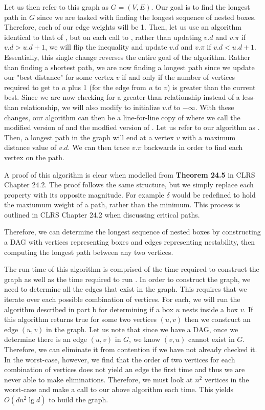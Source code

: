 \documentclass[11pt]{article}
\begin{document}
Let us then refer to this graph as $G = (V,E)$. Our goal is to find the longest path in $G$ since we are tasked with finding the longest sequence of nested boxes. Therefore, each of our edge weights will be 1. Then, let us use an algorithm identical to that of , but on each call to , rather than updating $v.d$ and $v.\pi$ if $v.d > u.d + 1$, we will flip the inequality and update $v.d$ and $v.\pi$ if $v.d < u.d + 1$. Essentially, this single change reverses the entire goal of the algorithm. Rather than finding a shortest path, we are now finding a longest path since we update our "best distance" for some vertex $v$ if and only if the number of vertices required to get to $u$ plus 1 (for the edge from $u$ to $v$) is greater than the current best. Since we are now checking for a greater-than relationship instead of a less-than relationship, we will also modify  to initialize $v.d$ to $-\infty$. With these changes, our algorithm can then be a line-for-line copy of  where we call the modified version of  and the modfied version of . Let us refer to our algorithm as . Then, a longest path in the graph will end at a vertex $v$ with a maximum distance value of $v.d$. We can then trace $v.\pi$ backwards in order to find each vertex on the path.

A proof of this algorithm is clear when modelled from \textbf{Theorem 24.5} in CLRS Chapter 24.2. The proof follows the same structure, but we simply replace each property with its opposite magnitude. For example $\delta$ would be redefined to hold the maxiumum weight of a path, rather than the minimum. This process is outlined in CLRS Chapter 24.2 when discussing critical paths.

Therefore, we can determine the longest sequence of nested boxes by constructing a DAG with vertices representing boxes and edges representing nestability, then computing the longest path between any two vertices.

The run-time of this algorithm is comprised of the time required to construct the graph as well as the time required to run . In order to construct the graph, we need to determine all the edges that exist in the graph. This requires that we iterate over each possible combination of vertices. For each, we will run the algorithm described in part b for determining if a box $u$ nests inside a box $v$. If this algorithm returns true for some two vertices $(u,v)$ then we construct an edge $(u,v)$ in the graph. Let us note that since we have a DAG, once we determine there is an edge $(u,v)$ in $G$, we know $(v,u)$ cannot exist in $G$. Therefore, we can eliminate it from contention if we have not already checked it. In the worst-case, however, we find that the order of two vertices for each combination of vertices does not yield an edge the first time and thus we are never able to make eliminations. Therefore, we must look at $n^2$ vertices in the worst-case and make a call to our above algorithm each time. This yields $O(dn^2\lg{d})$ to build the graph.
\end{document}
